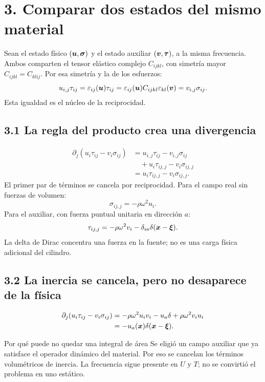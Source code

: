 \documentclass[11pt]{article}
\begin{document}
\newpage
\section*{3. Comparar dos estados del mismo material}
Sean el estado físico \((\bm{u},\boldsymbol\sigma)\) y el estado auxiliar
\((\bm{v},\boldsymbol\tau)\), a la misma frecuencia. Ambos comparten el
tensor elástico complejo \(C_{ijkl}\), con simetría mayor
\(C_{ijkl}=C_{klij}\). Por esa simetría y la de los esfuerzos:
\[
 u_{i,j}\tau_{ij}
 =\varepsilon_{ij}(\bm{u})\tau_{ij}
 =\varepsilon_{ij}(\bm{u})C_{ijkl}\varepsilon_{kl}(\bm{v})
 =v_{i,j}\sigma_{ij}.
\]
Esta igualdad es el núcleo de la reciprocidad.

\subsection*{3.1 La regla del producto crea una divergencia}
\[
 \begin{aligned}
 \partial_j(u_i\tau_{ij}-v_i\sigma_{ij})
 &=u_{i,j}\tau_{ij}-v_{i,j}\sigma_{ij}\\
 &\quad+u_i\tau_{ij,j}-v_i\sigma_{ij,j}\\
 &=u_i\tau_{ij,j}-v_i\sigma_{ij,j}.
 \end{aligned}
\]
El primer par de términos se cancela por reciprocidad. Para el campo real
sin fuerzas de volumen:
\[
 \sigma_{ij,j}=-\rho\omega^2u_i.
\]
Para el auxiliar, con fuerza puntual unitaria en dirección \(a\):
\[
 \tau_{ij,j}=-\rho\omega^2v_i-\delta_{ia}\delta(\bm{x}-\bm{\xi}).
\]
La delta de Dirac concentra una fuerza en la fuente; no es una carga
física adicional del cilindro.

\subsection*{3.2 La inercia se cancela, pero no desaparece de la física}
\[
 \begin{aligned}
 \partial_j(u_i\tau_{ij}-v_i\sigma_{ij})
 &=-\rho\omega^2u_iv_i-u_a\delta
   +\rho\omega^2v_iu_i\\
 &=-u_a(\bm{x})\delta(\bm{x}-\bm{\xi}).
 \end{aligned}
\]
\begin{idea}{Por qué puede no quedar una integral de área}
Se eligió un campo auxiliar que ya satisface el operador dinámico del
material. Por eso se cancelan los términos volumétricos de inercia.
La frecuencia sigue presente en \(U\) y \(T\); no se convirtió el problema
en uno estático.
\end{idea}
\end{document}
